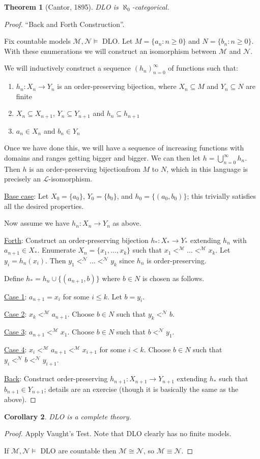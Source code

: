 \documentclass[]{article}
\theoremstyle{custhm}
\newtheorem{theorem}{Theorem}[section]
\theoremstyle{cusdef}
\theoremstyle{custhm}
\theoremstyle{custhm}
\newtheorem{cor}[theorem]{Corollary}
\theoremstyle{custhm}
\theoremstyle{ex}
\theoremstyle{custhm}
\theoremstyle{cusdef}
\theoremstyle{remark}
\theoremstyle{remark}
\theoremstyle{numremark}
\newcommand{\ra}{\rightarrow}
\renewcommand{\L}{\mathcal{L}}
\newcommand{\M}{\mathcal{M}}
\newcommand{\N}{\mathcal{N}}
\renewcommand{\subset}{\subseteq}
\begin{document}
\begin{theorem}[Cantor, 1895]
DLO is $\aleph_0$-categorical.
\end{theorem}
\begin{proof}
``Back and Forth Construction''.

Fix countable models $\M,\N\models$ DLO. Let $M = \{a_n:n\ge 0\}$ and $N = \{b_n:n\ge 0\}$. With these enumerations we will construct an isomorphism between $\M$ and $\N$.

We will inductively construct a sequence $(h_n)_{n=0}^{\infty}$ of functions such that:
\begin{enumerate}[label=\arabic*)]
	\item $h_n:X_n\ra Y_n$ is an order-preserving bijection, where $X_n\subset M$ and $Y_n\subset N$ are finite
	\item $X_n\subset X_{n+1}$, $Y_n\subset Y_{n+1}$ and $h_n\subset h_{n+1}$
	\item $a_n \in X_n$ and $b_n \in Y_n$
\end{enumerate}
Once we have done this, we will have a sequence of increasing functions with domains and ranges getting bigger and bigger. We can then let $h = \bigcup_{n=0}^{\infty}h_n$. Then $h$ is an order-preserving bijectionfrom $M$ to $N$, which in this language is precisely an $\L$-isomorphism.

\underline{Base case}: Let $X_0 = \{a_0\}$, $Y_0 = \{b_0\}$, and $h_0 = \{(a_0,b_0)\}$; this trivially satisfies all the desired properties.

Now assume we have $h_n:X_n\ra Y_n$ as above.

\underline{Forth}: Construct an order-preserving bijection $h_\ast:X_\ast\ra Y_\ast$ extending $h_n$ with $a_{n+1}\in X_\ast$. Enumerate $X_n = \{x_1,\dots,x_k\}$ such that $x_1 <^\M \dots <^\M x_k$. Let $y_i = h_n(x_i)$. Then $y_1 <^\N \dots <^\N y_k$ since $h_n$ is order-preserving.

Define $h_\ast = h_n \cup \{(a_{n+1},b)\}$ where $b\in N$ is chosen as follows.

\underline{Case 1}: $a_{n+1} = x_i$ for some $i\le k$. Let $b = y_i$.

\underline{Case 2}: $x_k <^\M a_{n+1}$. Choose $b\in N$ such that $y_k <^\N b$.

\underline{Case 3}: $a_{n+1} <^\M x_1$. Choose $b\in N$ such that $b <^\N y_1$.

\underline{Case 4}: $x_i <^\M a_{n+1} <^\M x_{i+1}$ for some $ i < k$. Choose $b \in N$ such that $y_i < ^\N b < ^\N y_{i+1}$.

\underline{Back}: Construct order-preserving $h_{n+1}:X_{n+1}\ra Y_{n+1}$ extending $h_\ast$ such that $b_{n+1}\in Y_{n+1}$; details are an exercise (though it is basically the same as the above).
\end{proof}
\begin{cor}
DLO is a complete theory.
\end{cor}
\begin{proof}
Apply Vaught's Test. Note that DLO clearly has no finite models.

If $\M,\N\models$ DLO are countable then $\M \cong \N$, so $\M \equiv \N$.
\end{proof}
\end{document}
